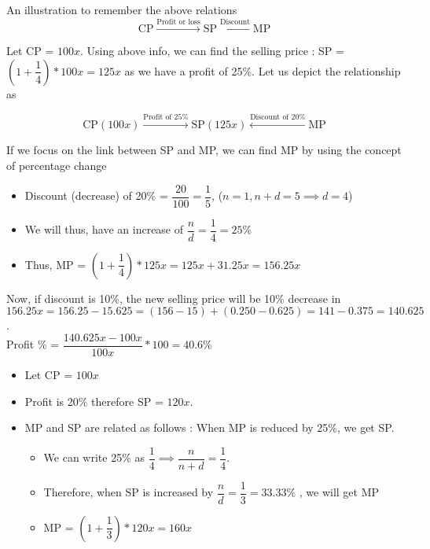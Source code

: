 An illustration to remember the above relations
$$
\text{CP} \xrightarrow{\text{Profit or loss}} \text{SP} \xleftarrow{\text{Discount}} \text{MP}
$$


Let CP = $100x$. Using above info, we can find the selling price :  SP = $(1 + \dfrac{1}{4}) * 100x = 125x$ as we have a profit of 25\%. Let us depict the relationship as 

$$
\text{CP}(100x) \xrightarrow{\text{Profit of 25\%}} \text{SP}(125x) \xleftarrow{\text{Discount of 20\%}} \text{MP}
$$

If we focus on the link between SP and MP, we can find MP by using the concept of percentage change 
\begin{itemize}
    \item Discount (decrease) of 20\% = $\dfrac{20}{100} = \dfrac{1}{5}$, ($n = 1,n + d = 5 \implies d = 4$)
    
    \item We will thus, have an increase of $\dfrac{n}{d} = \dfrac{1}{4} = 25\% $

    \item Thus, MP = $(1 + \dfrac{1}{4}) * 125x = 125x + 31.25x = 156.25x$
\end{itemize}    

Now, if discount is 10\%, the new selling price will be 10\% decrease in $156.25x = 156.25 - 15.625 = (156 - 15) + (0.250 - 0.625) = 141 - 0.375 = 140.625$. \\

Profit \% = $\dfrac{140.625x - 100x}{100x} * 100 = 40.6\%$


\begin{itemize}
    \item Let CP = $100x$
    \item Profit is 20\% therefore SP = $120x$.
    \item MP and SP are related as follows : When MP is reduced by 25\%, we get SP.
    \begin{itemize}
        \item We can write 25\% as $\dfrac{1}{4} \implies \dfrac{n}{n+d} = \dfrac{1}{4}$. 
        \item Therefore, when SP is increased by $\dfrac{n}{d} = \dfrac{1}{3} = 33.33\%$ , we will get MP
        \item MP = $( 1 + \dfrac{1}{3} ) * 120x = 160x$
    \end{itemize}
\end{itemize}

